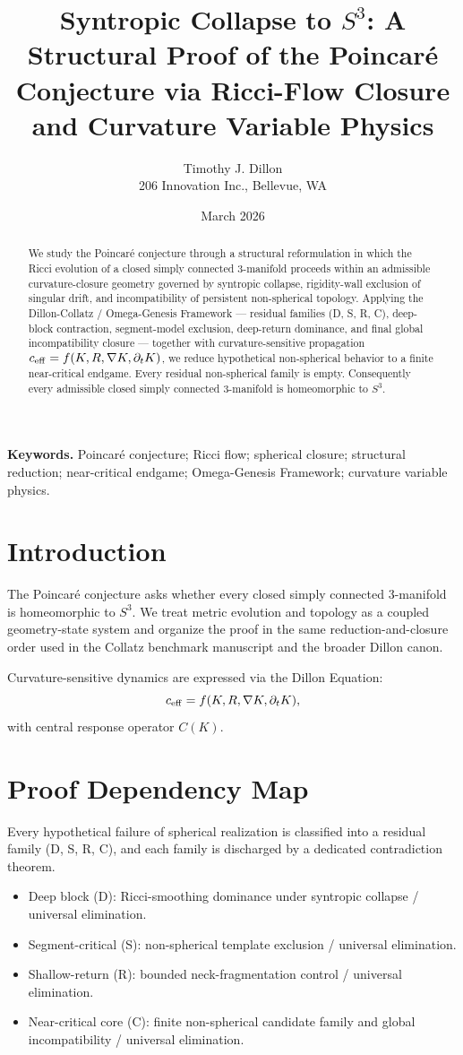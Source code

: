 \documentclass[11pt,a4paper]{article}
\title{Syntropic Collapse to \(S^3\): A Structural Proof of the Poincar\'e Conjecture via Ricci-Flow Closure and Curvature Variable Physics}
\author{Timothy J. Dillon \\ 206 Innovation Inc., Bellevue, WA}
\date{March 2026}
\begin{document}
\maketitle

\begin{abstract}
We study the Poincar\'e conjecture through a structural reformulation in which the Ricci evolution of a closed simply connected 3-manifold proceeds within an admissible curvature-closure geometry governed by syntropic collapse, rigidity-wall exclusion of singular drift, and incompatibility of persistent non-spherical topology. Applying the Dillon-Collatz / Omega-Genesis Framework --- residual families (D, S, R, C), deep-block contraction, segment-model exclusion, deep-return dominance, and final global incompatibility closure --- together with curvature-sensitive propagation \(c_{\rm eff} = f(K, R, \nabla K, \partial_t K)\), we reduce hypothetical non-spherical behavior to a finite near-critical endgame. Every residual non-spherical family is empty. Consequently every admissible closed simply connected 3-manifold is homeomorphic to \(S^3\).
\end{abstract}

\textbf{Keywords.} Poincar\'e conjecture; Ricci flow; spherical closure; structural reduction; near-critical endgame; Omega-Genesis Framework; curvature variable physics.

\section{Introduction}
The Poincar\'e conjecture asks whether every closed simply connected 3-manifold is homeomorphic to \(S^3\). We treat metric evolution and topology as a coupled geometry-state system and organize the proof in the same reduction-and-closure order used in the Collatz benchmark manuscript and the broader Dillon canon.

Curvature-sensitive dynamics are expressed via the Dillon Equation:
\[
c_{\rm eff} = f(K, R, \nabla K, \partial_t K),
\]
with central response operator \(C(K)\).

\section{Proof Dependency Map}
Every hypothetical failure of spherical realization is classified into a residual family (D, S, R, C), and each family is discharged by a dedicated contradiction theorem.

\begin{itemize}
    \item Deep block (D): Ricci-smoothing dominance under syntropic collapse / universal elimination.
    \item Segment-critical (S): non-spherical template exclusion / universal elimination.
    \item Shallow-return (R): bounded neck-fragmentation control / universal elimination.
    \item Near-critical core (C): finite non-spherical candidate family and global incompatibility / universal elimination.
\end{itemize}
\end{document}

